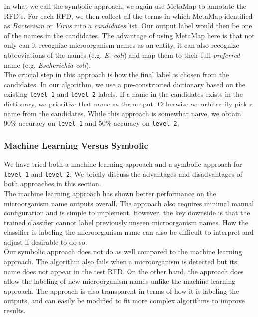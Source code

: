 \documentclass[11pt]{article}
\begin{document}
In what we call the symbolic approach, we again use MetaMap to annotate the RFD's. For each RFD, we then collect all the terms in which MetaMap identified as \textit{Bacterium} or \textit{Virus} into a \textit{candidates} list. Our output label would then be one of the names in the candidates. The advantage of using MetaMap here is that not only can it recognize microorganism names as an entity, it can also recognize abbreviations of the names (e.g. \textit{E. coli}) and map them to their full \textit{preferred} name (e.g. \textit{Escherichia coli}).
\\


The crucial step in this approach is how the final label is chosen from the candidates. In our algorithm, we use a pre-constructed dictionary based on the existing \verb|level_1| and \verb|level_2| labels. If a name in the candidates exists in the dictionary, we prioritize that name as the output. Otherwise we arbitrarily pick a name from the candidates. While this approach is somewhat na\"ive, we obtain 90\% accuracy on \verb|level_1| and 50\% accuracy on \verb|level_2|.


\subsubsection{Machine Learning Versus Symbolic} \label{machine learning versus symbolic}

We have tried both a machine learning approach and a symbolic approach for \verb|level_1| and \verb|level_2|. We briefly discuss the advantages and disadvantages of both approaches in this section.
\\

The machine learning approach has shown better performance on the microorganism name outputs overall. The approach also requires minimal manual configuration and is simple to implement. However, the key downside is that the trained classifier cannot label previously unseen microorganism names. How the classifier is labeling the microorganism name can also be difficult to interpret and adjust if desirable to do so.
\\

Our symbolic approach does not do as well compared to the machine learning approach. The algorithm also fails when a microorganism is detected but its name does not appear in the test RFD. On the other hand, the approach does allow the labeling of new microorganism names unlike the machine learning approach. The approach is also transparent in terms of how it is labeling the outputs, and can easily be modified to fit more complex algorithms to improve results.
\\
\end{document}
